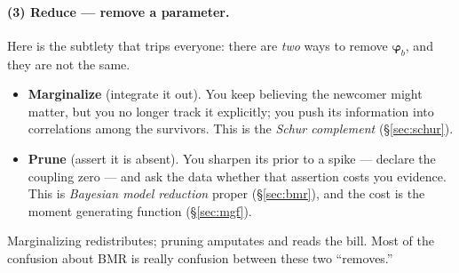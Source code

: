 \documentclass[11pt]{article}
\newcommand{\fvec}{\bm{\varphi}}    %
\theoremstyle{definition}
\begin{document}
\paragraph{(3) Reduce --- remove a parameter.} Here is the subtlety that
trips everyone: there are \emph{two} ways to remove $\fvec_b$, and they are
not the same.
\begin{itemize}
\item \textbf{Marginalize} (integrate it out). You keep believing the
newcomer might matter, but you no longer track it explicitly; you push its
information into correlations among the survivors. This is the
\emph{Schur complement} (\S\ref{sec:schur}).
\item \textbf{Prune} (assert it is absent). You sharpen its prior to a
spike --- declare the coupling zero --- and ask the data whether that
assertion costs you evidence. This is \emph{Bayesian model reduction}
proper (\S\ref{sec:bmr}), and the cost is the moment generating function
(\S\ref{sec:mgf}).
\end{itemize}
Marginalizing redistributes; pruning amputates and reads the bill. Most of
the confusion about BMR is really confusion between these two ``removes.''
\end{document}
